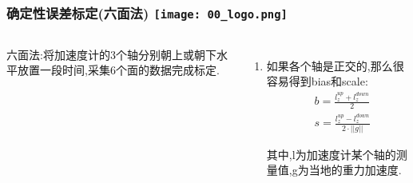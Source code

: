 
\begin{comment}
\end{comment}
\begin{frame}
\frametitle{确定性误差标定(六面法) \hfill \texttt{[image: 00\_logo.png]}}
\begin{columns}
  

  六面法:将加速度计的3个轴分别朝上或朝下水平放置一段时间,采集6个面的数据完成标定.
	\begin{enumerate}
		\item 如果各个轴是正交的,那么很容易得到bias和scale:
		\begin{equation}
      \begin{split}
          &b = \frac{l^{up}_z + l^{down}_z}{2} \\
          & s = \frac{l^{up}_z - l^{down}_z}{2 \cdot ||g||}
      \end{split}
    \end{equation}

    其中,l为加速度计某个轴的测量值,g为当地的重力加速度.

  \end{enumerate}
  
  

\end{columns}
\end{frame}


